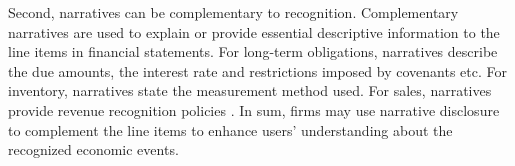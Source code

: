 \documentclass[letterpaper,11pt]{article}
\begin{document}
\begin{spacing}{1.5}
Second, narratives can be complementary to recognition. Complementary narratives are used to explain or provide essential descriptive information to the line items in financial statements. For long-term obligations, narratives describe the due amounts, the interest rate and restrictions imposed by covenants etc. For inventory, narratives state the measurement method used. For sales, narratives provide revenue recognition policies \cite[footnote 4, CON5-7]{fasbStatementFinancialAccounting1984}. In sum, firms may use narrative disclosure to complement the line items to enhance users' understanding about the recognized economic events.

\begin{comment}
	\citeA[footnote 4, CON5-7]{fasbStatementFinancialAccounting1984} gives several examples on the complementary role of notes to financial statements:
	
	\begin{adjustwidth}{1cm}{1cm}
	\begin{singlespace}
	\indent \textit{For example, notes provide essential descriptive information for long-term obligations, including when amounts are due, what interest they bear, and whether important restrictions are imposed by related covenants. For inventory, the notes provide information on the measurement method used---FIFO cost, LIFO cost, current market value, etc. For an estimated litigation liability, an extended discussion of the circumstances, counsel's opinions, and the basis for management's judgment may all be provided in the notes. For sales, useful information about revenue recognition policies may appear only in the notes (FASB Statement No. 47, Disclosure of Long-Term Obligations; ARB No. 43, Chapter 4, ``Inventory Pricing", statement 8; FASB Statement No. 5, Accounting for Contingencies, par. 10; and APB Statement 4, par. 199)}.
	\end{singlespace}
	\end{adjustwidth}
\end{comment}


\end{spacing}
\end{document}
